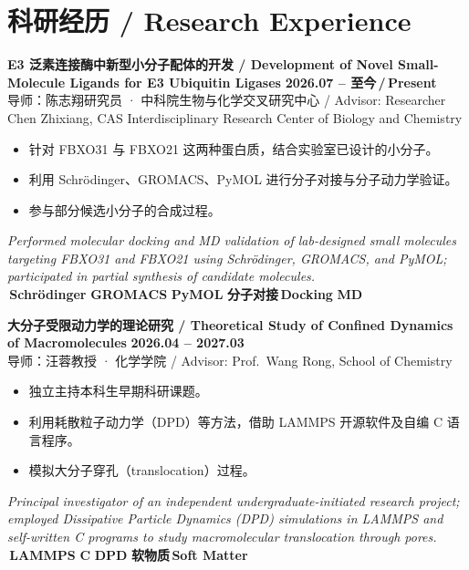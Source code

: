 \documentclass[11pt,a4paper]{article}
\newcommand{\purplechip}[1]{\colorbox{njupurplelight}{\textcolor{njupurple}{\footnotesize\bfseries\,#1\,}}}
\newcommand{\bluechip}[1]{\colorbox{njubluelight}{\textcolor{njublue}{\footnotesize\bfseries\,#1\,}}}
\newcommand{\cvdateinline}[1]{{\color{njublue}\small\bfseries #1}}
\newcommand{\muted}[1]{{\color{mutedgray}\small #1}}
\begin{document}
\section*{科研经历 \quad / \quad Research Experience}

\begin{rscard}
{\bfseries E3 泛素连接酶中新型小分子配体的开发 \;/\; Development of Novel Small-Molecule Ligands for E3 Ubiquitin Ligases} \hfill \cvdateinline{2026.07 -- 至今\,/\,Present}\\[2pt]
{\small\muted{导师：陈志翔研究员 · 中科院生物与化学交叉研究中心 \;/\; Advisor: Researcher Chen Zhixiang, CAS Interdisciplinary Research Center of Biology and Chemistry}}\\[2pt]
\begin{itemize}
  \item 针对 FBXO31 与 FBXO21 这两种蛋白质，结合实验室已设计的小分子。
  \item 利用 Schrödinger、GROMACS、PyMOL 进行分子对接与分子动力学验证。
  \item 参与部分候选小分子的合成过程。
\end{itemize}
{\itshape\small Performed molecular docking and MD validation of lab-designed small molecules targeting FBXO31 and FBXO21 using Schrödinger, GROMACS, and PyMOL; participated in partial synthesis of candidate molecules.}\\[4pt]
\hfill\bluechip{Schrödinger}\bluechip{GROMACS}\bluechip{PyMOL}\purplechip{分子对接\,Docking}\purplechip{MD}
\end{rscard}

\begin{rscard}
{\bfseries 大分子受限动力学的理论研究 \;/\; Theoretical Study of Confined Dynamics of Macromolecules} \hfill \cvdateinline{2026.04 -- 2027.03}\\[2pt]
{\small\muted{导师：汪蓉教授 · 化学学院 \;/\; Advisor: Prof.\ Wang Rong, School of Chemistry}}\\[2pt]
\begin{itemize}
  \item 独立主持本科生早期科研课题。
  \item 利用耗散粒子动力学（DPD）等方法，借助 LAMMPS 开源软件及自编 C 语言程序。
  \item 模拟大分子穿孔（translocation）过程。
\end{itemize}
{\itshape\small Principal investigator of an independent undergraduate-initiated research project; employed Dissipative Particle Dynamics (DPD) simulations in LAMMPS and self-written C programs to study macromolecular translocation through pores.}\\[4pt]
\hfill\bluechip{LAMMPS}\bluechip{C}\purplechip{DPD}\purplechip{软物质\,Soft Matter}
\end{rscard}
\end{document}
